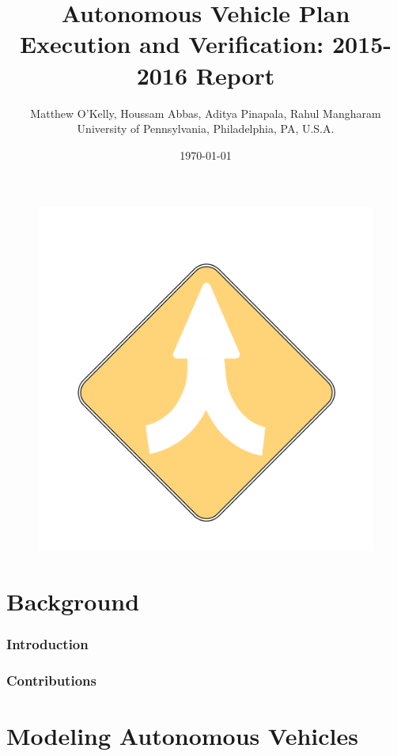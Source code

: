 \documentclass[11pt]{article}              %
\title{Autonomous Vehicle Plan Execution and Verification: 2015-2016 Report}   %
\author{Matthew O'Kelly, Houssam Abbas, Aditya Pinapala, Rahul Mangharam \\ \large University of Pennsylvania,
	Philadelphia, PA, U.S.A.\\}              %
\date{\today}                           %
\begin{document}

\begin{figure}
	\centering
	\includegraphics[scale=0.25]{figures/apexlogo}
\end{figure}

\maketitle                              %

\pagebreak
\tableofcontents                        %
\pagebreak
\part{Background}
\section{Introduction}


\section{Contributions} 

\part{Modeling Autonomous Vehicles}
\end{document}
